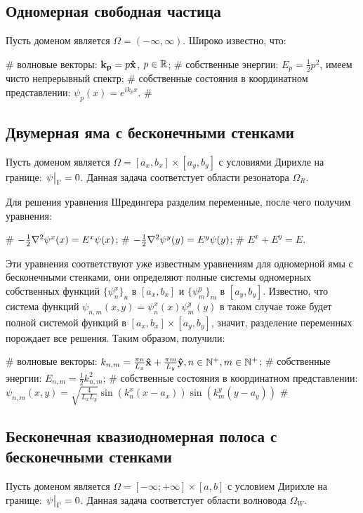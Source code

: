 \subsection{Одномерная свободная частица}
Пусть доменом является $\Omega = (-\infty, \infty)$. Широко известно, что:
\begin{ilist}
# волновые векторы: $\vb{k_{p}} = p \vb{\hat{x}}$, $p \in \mathbb{R}$;
# собственные энергии: $E_p = \frac{1}{2} p^2$, имеем чисто непрерывный спектр;
# собственные состояния в координатном представлении: $\psi_p(x) = e^{i k_p x}$. 
# 
\end{ilist}

\subsection{Двумерная яма с бесконечными стенками}
Пусть доменом является $\Omega = [a_x, b_x] \times [a_y, b_y]$ с условиями Дирихле на границе: $\eval{\psi}_{\Gamma} = 0$. Данная задача соответстует области резонатора $\Omega_R$.

Для решения уравнения Шредингера разделим переменные, после чего получим уравнения:
\begin{ilist}
# $-\frac{1}{2} \laplacian \psi^x(x) = E^x \psi(x)$;
# $-\frac{1}{2} \laplacian \psi^y(y) = E^y \psi(y)$;
# $E^x + E^y = E$.
\end{ilist}
Эти уравнения соответствуют уже известным уравнениям для одномерной ямы с бесконечными стенками, они определяют полные системы одномерных собственных функций $\{\psi^x_n\}_n$ в $[a_x, b_x]$ и $\{\psi^y_m\}_m$ в $[a_y, b_y]$. Известно, что система функций $\psi_{n, m}(x, y) = \psi_n^x(x) \psi_m^y(y)$ в таком случае тоже будет полной системой функций в $[a_x, b_x] \times [a_y, b_y]$, значит, разделение переменных порождает все решения. Таким образом, получили:

\begin{ilist}
# волновые векторы: $k_{n, m} = \frac{\pi n}{L_x} \vb{\hat{x}} + \frac{\pi m}{L_y} \vb{\hat{y}}, n \in \mathbb{N}^+, m \in \mathbb{N}^+$;
# собственные энергии: $E_{n, m} = \frac{1}{2} k_{n, m}^2$;
# собственные состояния в координатном представлении: $\psi_{n, m}(x, y) = \sqrt{\frac{4}{L_x L_y}} \sin(k^x_n (x - a_x)) \sin(k^y_m (y - a_y))$
# 
\end{ilist}

\subsection{Бесконечная квазиодномерная полоса с бесконечными стенками}
Пусть доменом является $\Omega = [-\infty; +\infty] \times [a, b]$ с условием Дирихле на границе: $\eval{\psi}_{\Gamma} = 0$. Данная задача соответстует области волновода $\Omega_W$.

